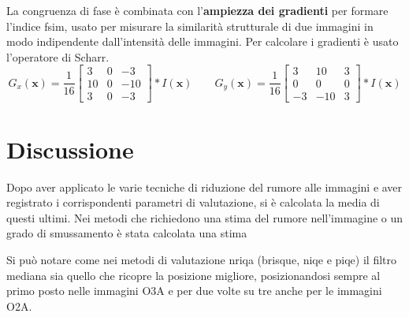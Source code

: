 \documentclass[../main.tex]{subfiles}
\begin{document}
La congruenza di fase è combinata con l'\textbf{ampiezza dei gradienti} per formare l'indice \acrshort{fsim}, usato per misurare la similarità strutturale di due immagini in modo indipendente dall'intensità delle immagini.\cite{zhang_2011} Per calcolare i gradienti è usato l'operatore di Scharr.\cite{jahne_1999}
\begin{equation}
	G_x(\mathbf{x}) = \frac{1}{16}\begin{bmatrix}
		3 & 0 & -3 \\
		10 & 0 & -10 \\
		3 & 0 & -3
	\end{bmatrix} * I(\mathbf{x}) \qquad
	G_y(\mathbf{x}) = \frac{1}{16}\begin{bmatrix}
		3 & 10 & 3 \\
		0 & 0 & 0 \\
		-3 & -10 & 3 
	\end{bmatrix} * I(\mathbf{x})
\end{equation}

\newpage

\section{Discussione}

Dopo aver applicato le varie tecniche di riduzione del rumore alle immagini e aver registrato i corrispondenti parametri di valutazione, si è calcolata la media di questi ultimi. Nei metodi che richiedono una stima del rumore nell'immagine o un grado di smussamento è stata calcolata una stima 

Si può notare come nei metodi di valutazione \acrshort{nriqa} (\acrshort{brisque}, \acrshort{niqe} e \acrshort{piqe}) il filtro mediana sia quello che ricopre la posizione migliore, posizionandosi sempre al primo posto nelle immagini O3A e per due volte su tre anche per le immagini O2A. 
\end{document}

